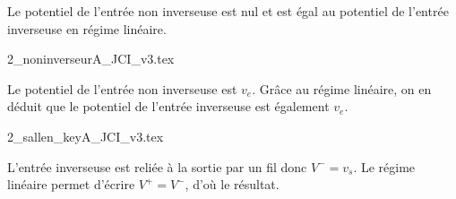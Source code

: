 
\begin{corrige}
  Le potentiel de l’entrée non inverseuse est nul et est égal au potentiel de l’entrée inverseuse en régime linéaire.
\end{corrige}




\begin{enonce}
  \shorthandoff{!:}
  {2_noninverseurA_JCI_v3.tex}
  \shorthandon{!:}
\end{enonce}


\begin{corrige}
  Le potentiel de l’entrée non inverseuse est \(v_{e}\). Grâce au régime linéaire, on en déduit que le potentiel de l’entrée inverseuse est également \(v_{e}\).
\end{corrige}



\vspace{-2mm}
\begin{enonce}
  \shorthandoff{!:}
  {2_sallen_keyA_JCI_v3.tex}
  \shorthandon{!:}
\end{enonce}


\begin{corrige}
  L’entrée inverseuse est reliée à la sortie par un fil donc \(V^{-} = v_{s}\). Le régime linéaire permet d’écrire \(V^{+} = V^{-}\), d’où le résultat.
\end{corrige}


\finEntrainement







